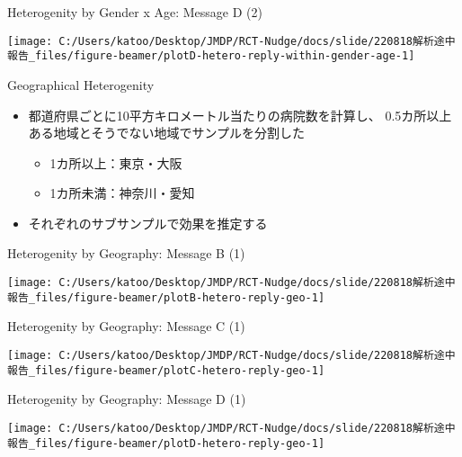 \documentclass[
      aspectratio=169,
        12pt,
    ]{beamer}
\providecommand{\tightlist}{%
  \setlength{\itemsep}{0pt}\setlength{\parskip}{0pt}}
\begin{document}
\begin{frame}{Heterogenity by Gender x Age: Message D (2)}
\protect\hypertarget{heterogenity-by-gender-x-age-message-d-2}{}
\begin{center}\texttt{[image: C:/Users/katoo/Desktop/JMDP/RCT-Nudge/docs/slide/220818解析途中報告\_files/figure-beamer/plotD-hetero-reply-within-gender-age-1]} \end{center}
\end{frame}

\begin{frame}{Geographical Heterogenity}
\protect\hypertarget{geographical-heterogenity}{}
\begin{itemize}
\tightlist
\item
  都道府県ごとに10平方キロメートル当たりの病院数を計算し、
  0.5カ所以上ある地域とそうでない地域でサンプルを分割した

  \begin{itemize}
  \tightlist
  \item
    1カ所以上：東京・大阪
  \item
    1カ所未満：神奈川・愛知
  \end{itemize}
\item
  それぞれのサブサンプルで効果を推定する
\end{itemize}
\end{frame}

\begin{frame}{Heterogenity by Geography: Message B (1)}
\protect\hypertarget{heterogenity-by-geography-message-b-1}{}
\begin{center}\texttt{[image: C:/Users/katoo/Desktop/JMDP/RCT-Nudge/docs/slide/220818解析途中報告\_files/figure-beamer/plotB-hetero-reply-geo-1]} \end{center}
\end{frame}

\begin{frame}{Heterogenity by Geography: Message C (1)}
\protect\hypertarget{heterogenity-by-geography-message-c-1}{}
\begin{center}\texttt{[image: C:/Users/katoo/Desktop/JMDP/RCT-Nudge/docs/slide/220818解析途中報告\_files/figure-beamer/plotC-hetero-reply-geo-1]} \end{center}
\end{frame}

\begin{frame}{Heterogenity by Geography: Message D (1)}
\protect\hypertarget{heterogenity-by-geography-message-d-1}{}
\begin{center}\texttt{[image: C:/Users/katoo/Desktop/JMDP/RCT-Nudge/docs/slide/220818解析途中報告\_files/figure-beamer/plotD-hetero-reply-geo-1]} \end{center}
\end{frame}
\end{document}

